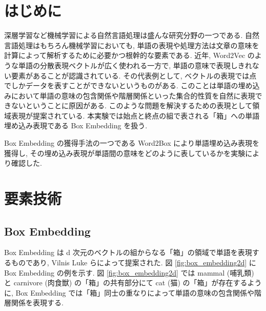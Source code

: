 \documentclass[twocolumn]{jarticle}     %
\begin{document}

\section{はじめに}
深層学習など機械学習による自然言語処理は盛んな研究分野の一つである. 
自然言語処理はもちろん機械学習においても, 単語の表現や処理方法は文章の意味を計算によって解析するために必要かつ根幹的な要素である.
近年, Word2Vec のような単語の分散表現ベクトルが広く使われる一方で, 単語の意味で表現しきれない要素があることが認識されている. 
その代表例として, ベクトルの表現では点でしかデータを表すことができないというものがある. 
このことは単語の埋め込みにおいて単語の意味の包含関係や階層関係といった集合的性質を自然に表現できないということに原因がある. 
このような問題を解決するための表現として領域表現が提案されている. 
本実験では始点と終点の組で表される「箱」への単語埋め込み表現である Box Embedding を扱う. 

Box Embedding の獲得手法の一つである Word2Box により単語埋め込み表現を獲得し, その埋め込み表現が単語間の意味をどのように表しているかを実験により確認した. 

\section{要素技術}
\subsection{Box Embedding}
Box Embedding は d 次元のベクトルの組からなる「箱」の領域で単語を表現するものであり, Vilnis Luke ら\cite{box-lattice}によって提案された. 
図 \ref{fig:box_embedding2d} に Box Embedding の例を示す. 
図 \ref{fig:box_embedding2d} では mammal (哺乳類) と carnivore (肉食獣) の「箱」の共有部分にて cat (猫) の「箱」が存在するように, Box Embedding では「箱」同士の重なりによって単語の意味の包含関係や階層関係を表現する. 
\end{document}

